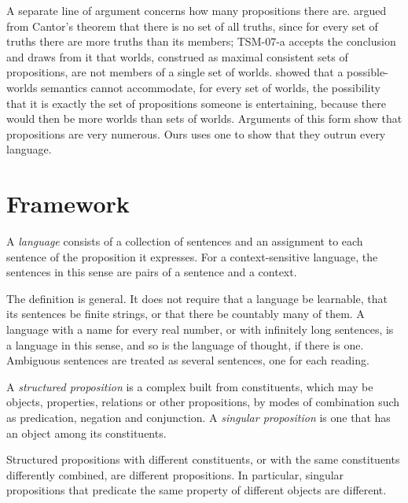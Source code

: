 \documentclass{situationist-preprint}
\begin{document}
A separate line of argument concerns how many propositions there are. \citet{Grim1991} argued from Cantor's theorem that there is no set of all truths, since for every set of truths there are more truths than its members; TSM-07-a accepts the conclusion and draws from it that worlds, construed as maximal consistent sets of propositions, are not members of a single set of worlds. \citet{Kaplan1995} showed that a possible-worlds semantics cannot accommodate, for every set of worlds, the possibility that it is exactly the set of propositions someone is entertaining, because there would then be more worlds than sets of worlds. Arguments of this form show that propositions are very numerous. Ours uses one to show that they outrun every language.

\section{Framework}\label{s:frame}

\begin{definition}\label{d:lang}
A \emph{language} consists of a collection of sentences and an assignment to each sentence of the proposition it expresses. For a context-sensitive language, the sentences in this sense are pairs of a sentence and a context.
\end{definition}

The definition is general. It does not require that a language be learnable, that its sentences be finite strings, or that there be countably many of them. A language with a name for every real number, or with infinitely long sentences, is a language in this sense, and so is the language of thought, if there is one. Ambiguous sentences are treated as several sentences, one for each reading.

\begin{definition}\label{d:struct}
A \emph{structured proposition} is a complex built from constituents, which may be objects, properties, relations or other propositions, by modes of combination such as predication, negation and conjunction. A \emph{singular proposition} is one that has an object among its constituents.
\end{definition}

\begin{principle}[Structure]\label{p:structure}
Structured propositions with different constituents, or with the same constituents differently combined, are different propositions. In particular, singular propositions that predicate the same property of different objects are different.
\end{principle}
\end{document}
